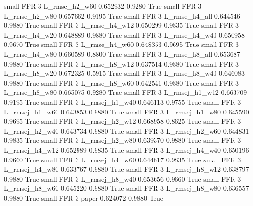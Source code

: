      small      FFR                 3  L_rmse_h2_w60   0.652932      0.9280    True
     small      FFR                 3  L_rmse_h2_w80   0.657662      0.9195    True
     small      FFR                 3  L_rmse_h4_all   0.644546      0.9880    True
     small      FFR                 3  L_rmse_h4_w12   0.650299      0.9835    True
     small      FFR                 3  L_rmse_h4_w20   0.648889      0.9880    True
     small      FFR                 3  L_rmse_h4_w40   0.650958      0.9670    True
     small      FFR                 3  L_rmse_h4_w60   0.648353      0.9695    True
     small      FFR                 3  L_rmse_h4_w80   0.660589      0.8800    True
     small      FFR                 3  L_rmse_h8_all   0.653687      0.9880    True
     small      FFR                 3  L_rmse_h8_w12   0.637514      0.9880    True
     small      FFR                 3  L_rmse_h8_w20   0.672325      0.5915    True
     small      FFR                 3  L_rmse_h8_w40   0.646083      0.9880    True
     small      FFR                 3  L_rmse_h8_w60   0.642541      0.9880    True
     small      FFR                 3  L_rmse_h8_w80   0.665075      0.9280    True
     small      FFR                 3 L_rmsej_h1_w12   0.663709      0.9195    True
     small      FFR                 3 L_rmsej_h1_w40   0.646113      0.9755    True
     small      FFR                 3 L_rmsej_h1_w60   0.643853      0.9880    True
     small      FFR                 3 L_rmsej_h1_w80   0.645590      0.9695    True
     small      FFR                 3 L_rmsej_h2_w12   0.668958      0.8625    True
     small      FFR                 3 L_rmsej_h2_w40   0.643734      0.9880    True
     small      FFR                 3 L_rmsej_h2_w60   0.644831      0.9835    True
     small      FFR                 3 L_rmsej_h2_w80   0.639370      0.9880    True
     small      FFR                 3 L_rmsej_h4_w12   0.652989      0.9835    True
     small      FFR                 3 L_rmsej_h4_w40   0.650196      0.9660    True
     small      FFR                 3 L_rmsej_h4_w60   0.644817      0.9835    True
     small      FFR                 3 L_rmsej_h4_w80   0.633767      0.9880    True
     small      FFR                 3 L_rmsej_h8_w12   0.638797      0.9880    True
     small      FFR                 3 L_rmsej_h8_w40   0.653656      0.9660    True
     small      FFR                 3 L_rmsej_h8_w60   0.645220      0.9880    True
     small      FFR                 3 L_rmsej_h8_w80   0.636557      0.9880    True
     small      FFR                 3          paper   0.624072      0.9880    True
